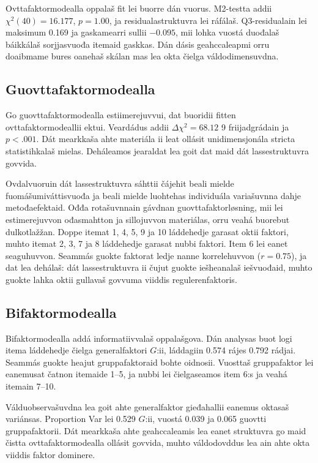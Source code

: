 \documentclass[11pt,a4paper]{article}
\begin{document}
Ovttafaktormodealla oppalaš fit lei buorre dán vuorus. M2-testta addii $\chi^2(40)=16.177$, $p=1.00$, ja residualastruktuvra lei ráfálaš. Q3-residualain lei maksimum 0.169 ja gaskamearri sullii $-0.095$, mii lohka vuostá duođalaš báikkálaš sorjjasvuođa itemaid gaskkas. Dán dásis geahccaleapmi orru doaibmame bures oanehaš skálan mas lea okta čielga váldodimensuvdna.

\subsection{Guovttafaktormodealla}
Go guovttafaktormodealla estiimerejuvvui, dat buoridii fitten ovttafaktormodeallii ektui. Veardádus addii $\Delta \chi^2 = 68.12$ 9 friijadgrádain ja $p < .001$. Dát mearkkaša ahte materiála ii leat ollásit unidimensjonála stricta statistihkalaš mielas. Deháleamos jearaldat lea goit dat maid dát lassestruktuvra govvida.

Ovdalvuoruin dát lassestruktuvra sáhttii čájehit beali mielde fuomášumiváttisvuođa ja beali mielde luohtehas individuála variašuvnna dahje metođaefektaid. Ođđa rotašuvnnain gávdnan guovttafaktorløsning, mii lei estimerejuvvon ođasmahtton ja sillojuvvon materiálas, orru veahá buorebut dulkotlažžan. Doppe itemat 1, 4, 5, 9 ja 10 láddehedje garasat oktii faktori, muhto itemat 2, 3, 7 ja 8 láddehedje garasat nubbi faktori. Item 6 lei eanet seaguhuvvon. Seammás guokte faktorat ledje nanne korrelehuvvon ($r = 0.75$), ja dat lea dehálaš: dát lassestruktuvra ii čujut guokte iešheanalaš iešvuođaid, muhto guokte lahka oktii gullavaš govvuma viiddis regulerenfaktoris.

\subsection{Bifaktormodealla}
Bifaktormodealla addá informatiivvalaš oppalašgova. Dán analysas buot logi itema láddehedje čielga generalfaktori $G$:ii, láddagiin 0.574 rájes 0.792 rádjai. Seammás guokte heajut gruppafaktoraid bohte oidnosii. Vuosttaš gruppafaktor lei eanemusat čatnon itemaide 1--5, ja nubbi lei čielgaseamos item 6:s ja veahá itemain 7--10.

Válduobservašuvdna lea goit ahte generalfaktor gieđahallii eanemus oktasaš variánsas. Proportion Var lei 0.529 $G$:ii, vuostá 0.039 ja 0.065 guovtti gruppafaktorii. Dát mearkkaša ahte geahccaleamis lea eanet struktuvra go maid čistta ovttafaktormodealla ollásit govvida, muhto váldodovddus lea ain ahte okta viiddis faktor dominere.
\end{document}
